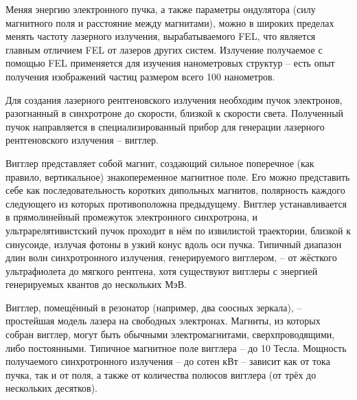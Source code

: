 Меняя энергию электронного пучка, а также параметры ондулятора (силу 
магнитного поля и расстояние между магнитами), можно в широких пределах менять 
частоту лазерного излучения, вырабатываемого FEL, что является главным 
отличием FEL от лазеров других систем. Излучение получаемое с помощью FEL 
применяется для изучения нанометровых структур -- есть опыт получения 
изображений частиц размером всего 100 нанометров. 

Для создания лазерного рентгеновского излучения необходим пучок электронов, 
разогнанный в синхротроне до скорости, близкой к скорости света. Полученный 
пучок направляется в специализированный прибор для генерации лазерного 
рентгеновского излучения -- вигглер.

Вигглер представляет собой магнит, создающий сильное поперечное (как правило, 
вертикальное) знакопеременное магнитное поле. Его можно представить себе как 
последовательность коротких дипольных магнитов, полярность каждого следующего 
из которых противоположна предыдущему. Вигглер устанавливается в прямолинейный 
промежуток электронного синхротрона, и ультрарелятивистский пучок проходит в 
нём по извилистой траектории, близкой к синусоиде, излучая фотоны в узкий 
конус вдоль оси пучка. Типичный диапазон длин волн синхротронного излучения, 
генерируемого вигглером, -- от жёсткого ультрафиолета до мягкого рентгена, 
хотя существуют вигглеры с энергией генерируемых квантов до нескольких МэВ.

Вигглер, помещённый в резонатор (например, два соосных зеркала), -- простейшая 
модель лазера на свободных электронах. Магниты, из которых собран вигглер, 
могут быть обычными электромагнитами, сверхпроводящими, либо постоянными. 
Типичное магнитное поле вигглера -- до 10 Тесла. Мощность получаемого 
синхротронного излучения -- до сотен кВт -- зависит как от тока пучка, так и 
от поля, а также от количества полюсов вигглера (от трёх до нескольких 
десятков).